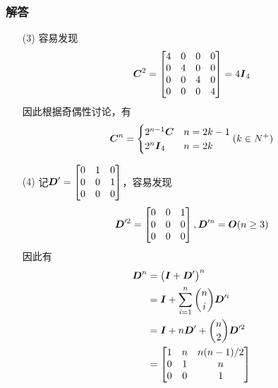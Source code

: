 \documentclass[9pt,xcolor=svgnames]{beamer} %
\begin{document}
\begin{frame}[allowframebreaks]
    \frametitle{解答}
    \begin{enumerate}
        \item[(3)]
              {
              容易发现
              \begin{equation*}
                  \boldsymbol{C}^2=
                  \begin{bmatrix}
                      4 & 0 & 0 & 0 \\
                      0 & 4 & 0 & 0 \\
                      0 & 0 & 4 & 0 \\
                      0 & 0 & 0 & 4
                  \end{bmatrix}=4\boldsymbol{I}_4
              \end{equation*}
              因此根据奇偶性讨论，有
              \begin{equation*}
                  \boldsymbol{C}^n=
                  \begin{cases}
                      2^{n-1}\boldsymbol{C} & n=2k-1 \\
                      2^n\boldsymbol{I}_4   & n=2k
                  \end{cases}
                  (k\in N^+)
              \end{equation*}
              }

        \item[(4)]
              {
              记\(\boldsymbol{D}'=\begin{bmatrix}0&1&0\\0&0&1\\0&0&0\end{bmatrix}\)，容易发现
              \begin{equation*}
                  \boldsymbol{D}'^2=\begin{bmatrix}0&0&1\\0&0&0\\0&0&0\end{bmatrix},\boldsymbol{D}'^n=\boldsymbol{O}(n\ge3)
              \end{equation*}
              因此有
              \begin{align*}
                  \boldsymbol{D}^n & =\left( \boldsymbol{I}+\boldsymbol{D}' \right)^n                  \\
                          & =\boldsymbol{I}+\sum_{i=1}^n\binom{n}{i}\boldsymbol{D}'^i \\
                          & =\boldsymbol{I}+n\boldsymbol{D}'+\binom{n}{2}\boldsymbol{D}'^2     \\
                          & =\begin{bmatrix}
                                 1 & n & n(n-1)/2 \\
                                 0 & 1 & n        \\
                                 0 & 0 & 1
                             \end{bmatrix}
              \end{align*}
              }
    \end{enumerate}
\end{frame}
\end{document}
